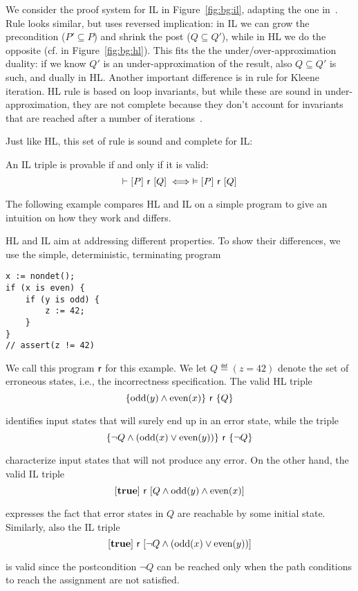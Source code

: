 We consider the proof system for IL in Figure~\ref{fig:bg:il}, adapting the one in~\cite{MOH21}.
Rule  looks similar, but uses reversed implication: in IL we can grow the precondition ($P' \subseteq P$) and shrink the post ($Q \subseteq Q'$), while in HL we do the opposite (cf.  in Figure~\ref{fig:bg:hl}). This fits the the under/over-approximation duality: if we know $Q'$ is an under-approximation of the result, also $Q \subseteq Q'$ is such, and dually in HL.
Another important difference is in rule  for Kleene iteration. HL rule  is based on loop invariants, but while these are sound in under-approximation, they are not complete because they don't account for invariants that are reached after a number of iterations~\cite[§4]{OHearn20}.

Just like HL, this set of rule is sound and complete for IL:

\begin{theorem}
	An IL triple is provable if and only if it is valid:
	\[
	\vdash[P]~\mathsf{r}~[Q] \iff \vDash[P]~\mathsf{r}~[Q]
	\]
\end{theorem}

The following example compares HL and IL on a simple program to give an intuition on how they work and differs.

\begin{example}\label{ex:bg:il-hl-comparison}
	HL and IL aim at addressing different properties. To show their differences, we use the simple, deterministic, terminating program
	\begin{verbatim}
x := nondet();
if (x is even) {
	if (y is odd) {
		z := 42;
	}
}
// assert(z != 42)
	\end{verbatim}
	We call this program $\mathsf{r}$ for this example.
	We let $Q \eqdef (z = 42)$ denote the set of erroneous states, i.e., the incorrectness specification.
	The valid HL triple
	\[
	\{ \text{odd}(y) \land \text{even}(x)\}~\mathsf{r}~\{Q\}
	\]

	\noindent
	identifies input states that will surely end up in an  error state, while the triple
	\[
	\{ \neg Q \land (\text{odd}(x) \lor \text{even}(y))\}~\mathsf{r}~\{\neg Q\}
	\]

	\noindent
	characterize input states that will not produce any error.
	On the other hand, the valid IL triple
	\[
	[\textbf{true}]~\mathsf{r}~[Q \wedge \text{odd}(y) \wedge \text{even}(x) ]
	\]

	\noindent
	expresses the fact that error states in $Q$ are reachable by some initial state. Similarly, also the IL triple
	\[
	[\textbf{true}]~\mathsf{r}~[\neg Q \wedge(\text{odd}(x)\vee \text{even}(y)) ]
	\]

	\noindent
	is valid since the postcondition $\neg Q$ can be reached only when the path conditions to reach the assignment are not satisfied.
\end{example}

